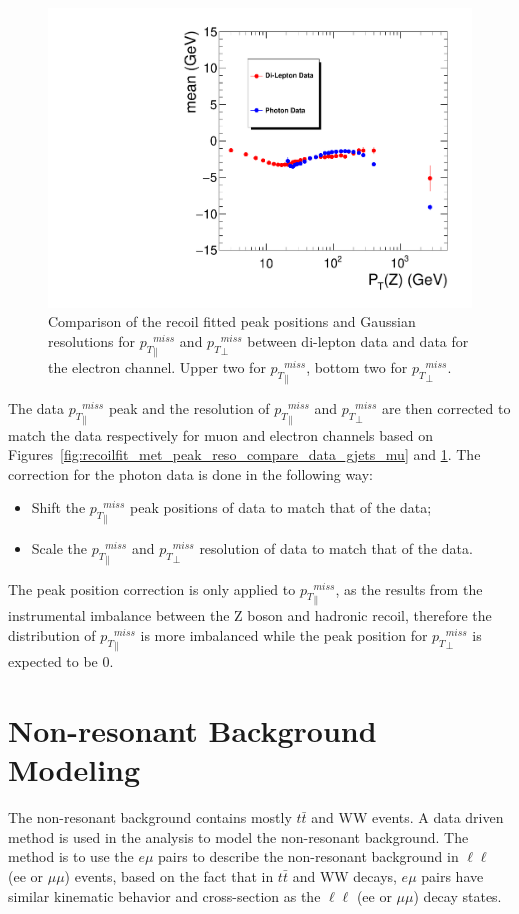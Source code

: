 \begin{figure}[htbp]
\begin{center}
\includegraphics[width=0.46\linewidth, page=7]{figures/plots_SingleEMU_Run2016Full_03Feb2017_allcorV2_met_para_study_ZSelecLowLPt_el_VS_SinglePhoton_Run2016Full_03Feb2017_allcorV2_NoRecoil_met_para_study_ZSelecLowLPt_el.pdf}
\caption{Comparison of the recoil fitted peak positions and Gaussian resolutions for ${p_{T}}^{miss}_\parallel$ and ${p_{T}}^{miss}_\perp$ between di-lepton data and \gjets data for the electron channel. Upper two for 
${p_{T}}^{miss}_\parallel$, bottom two for ${p_{T}}^{miss}_\perp$.}
\label{fig:recoilfit_met_peak_reso_compare_data_gjets_el}
\end{center}
\end{figure}

The \gjets data ${p_{T}}^{miss}_\parallel$ peak and the resolution of ${p_{T}}^{miss}_\parallel$ and ${p_{T}}^{miss}_\perp$ are then corrected to match the \Zjets data respectively for muon and electron channels based on Figures~\ref{fig:recoilfit_met_peak_reso_compare_data_gjets_mu} and \ref{fig:recoilfit_met_peak_reso_compare_data_gjets_el}. The correction for the photon data is done in the following way:
\begin{itemize}
\item Shift the ${p_{T}}^{miss}_\parallel$ peak positions of \gjets data to match that of the \Zjets data;
\item Scale the ${p_{T}}^{miss}_\parallel$ and ${p_{T}}^{miss}_\perp$ resolution of \gjets data to match that of the \Zjets data.
\end{itemize}

The peak position correction is only applied to ${p_{T}}^{miss}_\parallel$, as the \ptmiss results from the instrumental imbalance between the Z boson and hadronic recoil, therefore the distribution of ${p_{T}}^{miss}_\parallel$ is more imbalanced while the peak position for ${p_{T}}^{miss}_\perp$ is expected to be 0.

\clearpage
\section{Non-resonant Background Modeling}
The non-resonant background contains mostly $t\bar{t}$ and WW events. A data driven method is used in the analysis to model the non-resonant background. The method is to use the $e\mu$ pairs to describe the non-resonant background in $\ell\ell$ (ee or $\mu \mu$) events, based on the fact that in $t\bar{t}$ and WW decays, $e\mu$ pairs have similar kinematic behavior and cross-section as the $\ell\ell$ (ee or $\mu \mu$) decay states.

